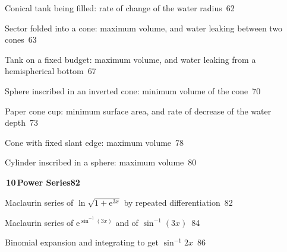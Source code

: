 \documentclass[a4paper,openany]{book}
\begin{document}
{\noindent{}\quad Conical tank being filled: rate of change of the water radius\dotfill\ 62\par
\noindent{}\quad Sector folded into a cone: maximum volume, and water leaking between two cones\dotfill\ 63\par
\noindent{}\quad Tank on a fixed budget: maximum volume, and water leaking from a hemispherical bottom\dotfill\ 67\par
\noindent{}\quad Sphere inscribed in an inverted cone: minimum volume of the cone\dotfill\ 70\par
\noindent{}\quad Paper cone cup: minimum surface area, and rate of decrease of the water depth\dotfill\ 73\par
\noindent{}\quad Cone with fixed slant edge: maximum volume\dotfill\ 78\par
\noindent{}\quad Cylinder inscribed in a sphere: maximum volume\dotfill\ 80\par
\medskip\noindent\colorbox{blue!8}{\parbox{\dimexpr\textwidth-2\fboxsep}{\large\bfseries\color{blue!50!black}\colorbox{blue!50!black}{\color{white}\,10\,}\quad Power Series\hfill 82}}\par\nopagebreak\smallskip\nopagebreak
\noindent{}\quad Maclaurin series of $\ln \sqrt {1+\mathrm {e}^{3x}}$ by repeated differentiation\dotfill\ 82\par
\noindent{}\quad Maclaurin series of $\mathrm {e}^{\sin ^{-1}(3x)}$ and of $\sin ^{-1}(3x)$\dotfill\ 84\par
\noindent{}\quad Binomial expansion and integrating to get $\sin ^{-1}2x$\dotfill\ 86\par
}
\end{document}
